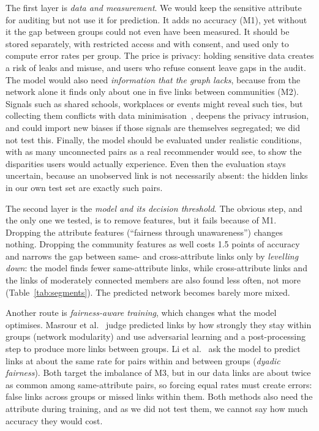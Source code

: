 \documentclass[runningheads]{llncs}
\begin{document}
The first layer is \emph{data and measurement}. We would keep the sensitive attribute for auditing but not use it for prediction. It adds no accuracy (M1), yet without it the gap between groups could not even have been measured. It should be stored separately, with restricted access and with consent, and used only to compute error rates per group. The price is privacy: holding sensitive data creates a risk of leaks and misuse, and users who refuse consent leave gaps in the audit. The model would also need \emph{information that the graph lacks}, because from the network alone it finds only about one in five links between communities (M2). Signals such as shared schools, workplaces or events might reveal such ties, but collecting them conflicts with data minimisation~\cite[Art.~5(1)(c)]{gdpr2016}, deepens the privacy intrusion, and could import new biases if those signals are themselves segregated; we did not test this. Finally, the model should be evaluated under realistic conditions, with as many unconnected pairs as a real recommender would see, to show the disparities users would actually experience. Even then the evaluation stays uncertain, because an unobserved link is not necessarily absent: the hidden links in our own test set are exactly such pairs.

The second layer is the \emph{model and its decision threshold}. The obvious step, and the only one we tested, is to remove features, but it fails because of M1. Dropping the attribute features (``fairness through unawareness'') changes nothing. Dropping the community features as well costs 1.5 points of accuracy and narrows the gap between same- and cross-attribute links only by \emph{levelling down}: the model finds fewer same-attribute links, while cross-attribute links and the links of moderately connected members are also found less often, not more (Table~\ref{tab:segments}). The predicted network becomes barely more mixed.

Another route is \emph{fairness-aware training}, which changes what the model optimises. Masrour et al.~\cite{masrour2020} judge predicted links by how strongly they stay within groups (network modularity) and use adversarial learning and a post-processing step to produce more links between groups. Li et al.~\cite{li2021dyadic} ask the model to predict links at about the same rate for pairs within and between groups (\emph{dyadic fairness}). Both target the imbalance of M3, but in our data links are about twice as common among same-attribute pairs, so forcing equal rates must create errors: false links across groups or missed links within them. Both methods also need the attribute during training, and as we did not test them, we cannot say how much accuracy they would cost.
\end{document}
